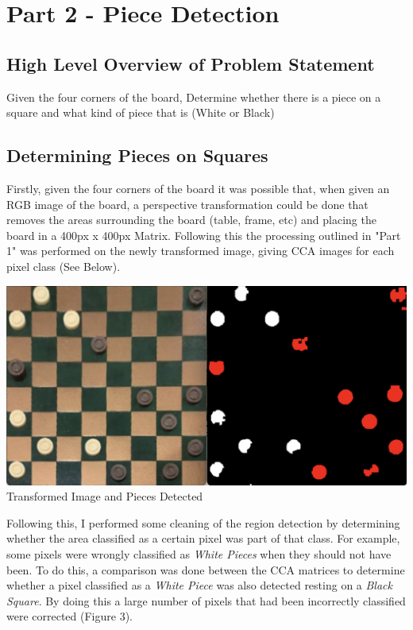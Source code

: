 \documentclass[11pt]{article}
\begin{document}
    \newpage
    \section{Part 2 - Piece Detection}
    \subsection{High Level Overview of Problem Statement}
    \par
    Given the four corners of the board, Determine whether there is a piece on a square and what kind of piece that is (White or Black)

    \subsection{Determining Pieces on Squares}
    \par
    Firstly, given the four corners of the board it was possible that, when given an RGB image of the board, a perspective transformation could be done that removes the areas surrounding the board (table, frame, etc) and placing the board in a 400px x 400px Matrix. Following this the processing outlined in "Part 1" was
    performed on the newly transformed image, giving CCA images for each pixel class (See Below).
    \begin{center}
        \includegraphics[scale=0.25]{TransformedAndPieces.png}
        \newline
        Transformed Image and Pieces Detected
    \end{center}
    \par
    Following this, I performed some cleaning of the region detection by determining whether the area classified as a certain pixel was part of that class. For example, some pixels were wrongly classified as \emph{White Pieces} when they should not have been. To do this, a 
    comparison was done between the CCA matrices to determine whether a pixel classified as a \emph{White Piece} was also detected resting on a \emph{Black Square}. By doing this a large number of pixels that had been incorrectly classified were corrected (Figure 3).
\end{document}
